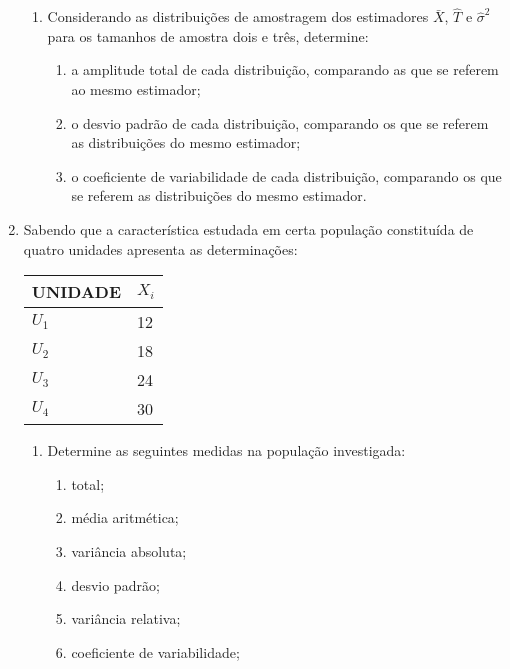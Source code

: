 \begin{enumerate}[resume]
\begin{enumerate}
	\item Considerando as distribuições de amostragem dos estimadores $\bar{X}$, $\hat{T}$ e $\hat{\sigma}^{2}$ para os tamanhos de amostra dois e três, determine:
		\begin{enumerate}
		\item a amplitude total de cada distribuição, comparando as que se referem ao mesmo estimador;
		\item o desvio padrão de cada distribuição, comparando os que se referem as distribuições do mesmo estimador;
		\item o coeficiente de variabilidade de cada distribuição, comparando os que se referem as distribuições do mesmo estimador.
		\end{enumerate}
	\end{enumerate}	

\item Sabendo que a característica estudada em certa população constituída de quatro unidades apresenta as determinações:
	\begin{table}[!htb]
	\centering
	\vspace{0.5cm}
	\begin{tabular}{ll}
	UNIDADE & $X_{i}$ \\
	\hline 
	$U_{1}$ & 12 \\
	$U_{2}$ & 18 \\
	$U_{3}$ & 24 \\
	$U_{4}$ & 30 \\
	\end{tabular}
	\end{table}
	
	\begin{enumerate}
	\item Determine as seguintes medidas na população investigada:
		\begin{enumerate}
		\item total;
		\item média aritmética;
		\item variância absoluta;
		\item desvio padrão;
		\item variância relativa;
		\item coeficiente de variabilidade;
		\end{enumerate}
	

\end{enumerate}
\end{enumerate}

